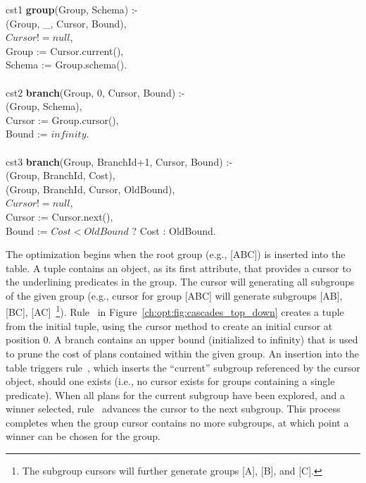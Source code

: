 \begin{figure*}
\ssp
\centering
\begin{boxedminipage}{\linewidth}
cst1 {\bf group}(Group, Schema) :- \\
(Group, \_, Cursor, Bound), \\
\datalogspace $Cursor != null$, \\
\datalogspace Group := Cursor.current(), \\
\datalogspace Schema := Group.schema(). \\
\\
cst2 {\bf branch}(Group, 0, Cursor, Bound) :- \\
(Group, Schema), \\
\datalogspace Cursor := Group.cursor(), \\
\datalogspace Bound  := $infinity$. \\
\\
cst3 {\bf branch}(Group, BranchId+1, Cursor, Bound) :- \\
(Group, BranchId, Cost), \\
(Group, BranchId, Cursor, OldBound), \\
\datalogspace $Cursor != null$, \\
\datalogspace Cursor := Cursor.next(), \\
\datalogspace Bound := $Cost < OldBound$ ? Cost : OldBound. \\
  
\end{boxedminipage}
\caption{\label{ch:opt:fig:cascades_top_down} Cascades top down search strategy rules.}
\end{figure*}

The optimization begins when the root group (e.g., [ABC]) is inserted into the
 table.  A  tuple contains an object, as its first
attribute, that provides a cursor to the underlining predicates in the group.
The cursor will generating all subgroups of the given group (e.g., cursor for
group [ABC] will generate subgroups [AB], [BC], [AC]~\footnote{The subgroup
cursors will further generate groups [A], [B], and [C].}).  Rule~ in
Figure~\ref{ch:opt:fig:cascades_top_down} creates a  tuple from
the initial  tuple, using the {\emph cursor} method to create an
initial cursor at position $0$.  A branch contains an upper bound (initialized
to infinity) that is used to prune the cost of plans contained within the given
group.  An insertion into the  table triggers rule~, which
inserts the ``current'' subgroup referenced by the cursor object, should one
exists (i.e., no cursor exists for groups containing a single predicate).  When
all plans for the current subgroup have been explored, and a winner selected,
rule~ advances the cursor to the next subgroup.  This process
completes when the group cursor contains no more subgroups, at which point a
winner can be chosen for the group.


